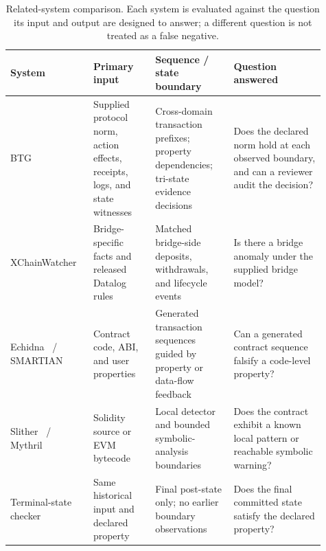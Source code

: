 \begin{table}[t]\centering\tiny\setlength{\tabcolsep}{2pt}
\caption{Related-system comparison. Each system is evaluated against the question its input and output are designed to answer; a different question is not treated as a false negative.}
\label{tab:related-systems}
\begin{tabular}{@{}p{0.20\linewidth}p{0.19\linewidth}p{0.24\linewidth}p{0.28\linewidth}@{}}\toprule
System & Primary input & Sequence / state boundary & Question answered \\ \midrule
BTG & Supplied protocol norm, action effects, receipts, logs, and state witnesses & Cross-domain transaction prefixes; property dependencies; tri-state evidence decisions & Does the declared norm hold at each observed boundary, and can a reviewer audit the decision? \\
XChainWatcher~\cite{augusto2025xchainwatcher} & Bridge-specific facts and released Datalog rules & Matched bridge-side deposits, withdrawals, and lifecycle events & Is there a bridge anomaly under the supplied bridge model? \\
Echidna~\cite{echidna,echidnarepo} / SMARTIAN~\cite{choi2021smartian} & Contract code, ABI, and user properties & Generated transaction sequences guided by property or data-flow feedback & Can a generated contract sequence falsify a code-level property? \\
Slither~\cite{feist2019slither,slitherrepo} / Mythril~\cite{mythril} & Solidity source or EVM bytecode & Local detector and bounded symbolic-analysis boundaries & Does the contract exhibit a known local pattern or reachable symbolic warning? \\
Terminal-state checker & Same historical input and declared property & Final post-state only; no earlier boundary observations & Does the final committed state satisfy the declared property? \\
\bottomrule
\end{tabular}
\end{table}
